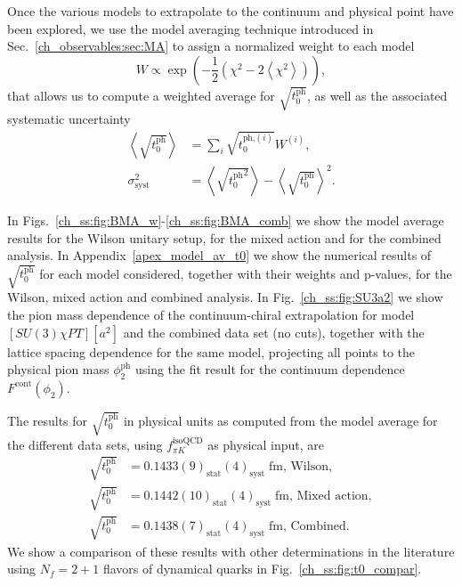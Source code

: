 Once the various models to extrapolate to the continuum and physical point have been explored, we use the model averaging technique introduced in Sec.~\ref{ch_observables:sec:MA} to assign a normalized weight to each model 
\begin{equation}
\label{ch_ss:eq:W}
W\propto\exp\left(-\frac{1}{2}\left(\chi^2-2\left<\chi^2\right>\right)\right),
\end{equation}
that allows us to compute a weighted average for $\sqrt{t_0^{\textrm{ph}}}$, as well as the associated systematic uncertainty
\begin{align}
\left<\sqrt{t_0^{\textrm{ph}}}\right>&=\sum_i\sqrt{t_0^{\textrm{ph,}(i)}}W^{(i)},\\
\sigma^2_{\textrm{syst}}&=\left<\sqrt{{t_0^{\textrm{ph}}}^2}\right>-\left<\sqrt{t_0^{\textrm{ph}}}\right>^2.
\end{align}

In Figs.~\ref{ch_ss:fig:BMA_w}-\ref{ch_ss:fig:BMA_comb} we show the model average results for the Wilson unitary setup, for the mixed action and for the combined analysis. In Appendix~\ref{apex_model_av_t0} we show the numerical results of $\sqrt{t_0^{\textrm{ph}}}$ for each model considered, together with their weights and p-values, for the Wilson, mixed action and combined analysis. In Fig.~\ref{ch_ss:fig:SU3a2} we show the pion mass dependence of the continuum-chiral extrapolation for model $[SU(3)\chi PT][a^2]$ and the combined data set (no cuts), together with the lattice spacing dependence for the same model, projecting all points to the physical pion mass $\phi_2^{\textrm{ph}}$ using the fit result for the continuum dependence $F^{\textrm{cont}}(\phi_2)$.

The results for $\sqrt{t_0^{\textrm{ph}}}$ in physical units as computed from the model average for the different data sets, using $f_{\pi K}^{\textrm{isoQCD}}$ as physical input, are
\begin{align}
\label{ch_ss:eq:t0ph_w}
\sqrt{t_0^{\textrm{ph}}}&=0.1433(9)_{\textrm{stat}}(4)_{\textrm{syst}}\;\textrm{fm, Wilson}, \\
\label{ch_ss:eq:t0ph_tm}
\sqrt{t_0^{\textrm{ph}}}&=0.1442(10)_{\textrm{stat}}(4)_{\textrm{syst}}\;\textrm{fm, Mixed action}, \\
\label{ch_ss:eq:t0ph_c}
\sqrt{t_0^{\textrm{ph}}}&=0.1438(7)_{\textrm{stat}}(4)_{\textrm{syst}}\;\textrm{fm, Combined}.
\end{align}
We show a comparison of these results with other determinations in the literature using $N_f=2+1$ flavors of dynamical quarks in Fig.~\ref{ch_ss:fig:t0_compar}.

